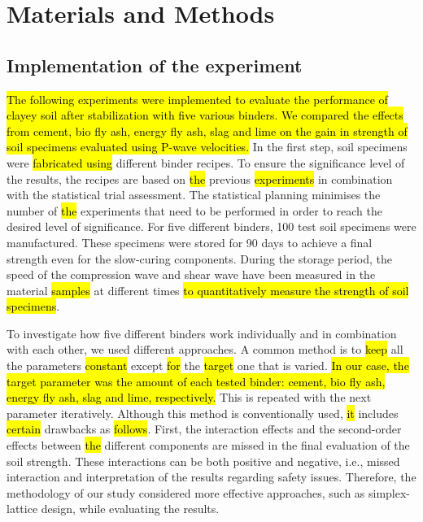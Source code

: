 \documentclass[constrmater,article,submit,pdftex,moreauthors]{Definitions/mdpi}
\begin{document}
\section{Materials and Methods}

\subsection{Implementation of the experiment}

\hl{The following experiments were implemented to evaluate the performance of clayey soil after stabilization with five various binders. We compared the effects from cement, bio fly ash, energy fly ash, slag and lime on the gain in strength of soil specimens evaluated using P-wave velocities.} In the first step, soil specimens were \hl{fabricated using} different binder recipes. To ensure the significance level of the results, the recipes are based on \hl{the }previous \hl{experiments} in combination with the statistical trial assessment. The statistical planning minimises the number of \hl{the }experiments that need to be performed in order to reach the desired level of significance. For five different binders, 100 test soil specimens were manufactured. These specimens were stored for\hl{ }90 days to achieve a final strength even for the slow-curing components. During the storage period, the speed of the compression wave and\hl{ }shear wave have been measured in the material \hl{samples }at different times \hl{to quantitatively measure the strength of soil specimens}. 

To investigate how five different binders work individually and in combination with each other, we used different approaches. A common method is to \hl{keep} all the parameters \hl{constant }except \hl{for }the \hl{target }one that is varied. \hl{In our case, the target parameter was the amount of each tested binder: cement, bio fly ash, energy fly ash, slag and lime, respectively. }This is repeated with the next parameter iteratively. Although this method is conventionally used, \hl{it }includes \hl{certain} drawbacks as \hl{follows}. First, the interaction effects and the second-order effects between \hl{the }different components are missed in the final evaluation of the soil strength. These interactions can be both positive and negative, i.e., missed interaction and interpretation of the results regarding safety issues. Therefore, the methodology of our study considered more effective approaches, such as simplex-lattice design, while evaluating the results.
\end{document}

